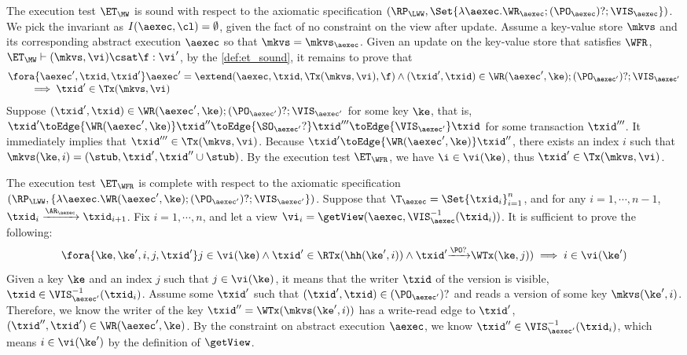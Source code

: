 The execution test $\ET_\MW$ is sound with respect to the axiomatic specification 
\( (\RP_{\LWW}, \Set{\lambda \aexec. \WR_\aexec ; (\PO_{\aexec})? ; \VIS_{\aexec} })\).
We pick the invariant as \( I( \aexec, \cl ) = \emptyset \), given the fact of no constraint on the view after update.
Assume a key-value store \( \mkvs \) and its corresponding abstract execution \( \aexec \) so that \( \mkvs = \mkvs_\aexec \).
Given an update on the key-value store that satisfies \( \WFR \), \ie \(\ET_\MW \vdash (\mkvs, \vi) \csat \f : \vi' \),
by the \cref{def:et_sound}, it remains to prove that
\[
    \begin{array}{@{}l@{}}
        \fora{ \aexec', \txid, \txid' } 
        \aexec' = \extend(\aexec, \txid, \Tx(\mkvs, \vi) , \f ) 
        \land (\txid' ,\txid)  \in \WR(\aexec',\ke) ; (\PO_{\aexec'})? ; \VIS_{\aexec'}   \\
        \qquad {} \implies \txid' \in \Tx(\mkvs, \vi) 
    \end{array}
\]
Suppose \( (\txid' ,\txid)  \in \WR(\aexec', \ke) ; (\PO_{\aexec'})? ; \VIS_{\aexec'} \) for some key \( \ke \),
that is, \( \txid' \toEdge{\WR(\aexec', \ke)} \txid'' \toEdge{\SO_{\aexec'}?} \txid''' \toEdge{\VIS_{\aexec'}} \txid \) for some transaction \( \txid''' \).
It immediately implies that \( \txid''' \in \Tx(\mkvs, \vi)  \).
Because \( \txid' \toEdge{\WR(\aexec', \ke)} \txid'' \), there exists an index \( i \) such that \( \mkvs(\ke, i) = (\stub, \txid', \txid'' \cup \stub) \).
By the execution test \( \ET_\WFR \), we have \( \i \in \vi( \ke ) \), thus \( \txid' \in \Tx(\mkvs, \vi ) \).


The execution test $\ET_\WFR$ is complete with respect to the axiomatic specification 
\( (\RP_{\LWW}, \{\lambda \aexec. \WR(\aexec', \ke) ; (\PO_{\aexec'})? ; \VIS_{\aexec'} \})\).
Suppose that $\T_{\aexec} = \Set{\txid_{i}}_{i=1}^{n}$, and for any $i=1,\cdots, n-1$,
$\txid_{i} \xrightarrow{\AR_{\aexec}} \txid_{i+1}$.
Fix $i=1,\cdots,n$, and let a view $\vi_{i} = \getView(\aexec, \VIS^{-1}_{\aexec}(\txid_{i}))$.
It is sufficient to prove the following:
\[
    \fora{\ke, \ke', i, j, \txid'} j \in \vi(\ke) \land \txid' \in \RTx(\hh(\ke', i)) \land \txid' {\xrightarrow{\PO?}} \WTx(\ke, j) ) \implies i \in \vi(\ke')
\]
Given a key \( \ke \) and an index \( j \) such that \( j \in \vi(\ke) \), 
it means that the writer \( \txid \) of the version is visible, \ie \( \txid \in \VIS_{\aexec'}^{-1}(\txid_i) \).
Assume some \( \txid' \) such that \( (\txid', \txid) \in (\PO_{\aexec'})? \) and reads a version of some key \( \mkvs(\ke',i) \).
Therefore, we know the writer of the key \( \txid'' = \WTx(\mkvs(\ke',i)) \) has a write-read edge to \( \txid' \), 
\ie \( (\txid'', \txid') \in \WR(\aexec', \ke)  \).
By the constraint on abstract execution \( \aexec \), we know \( \txid'' \in \VIS^{-1}_{\aexec'}(\txid_{i}) \),
which means \( i \in \vi(\ke')\) by the definition of \( \getView \).

